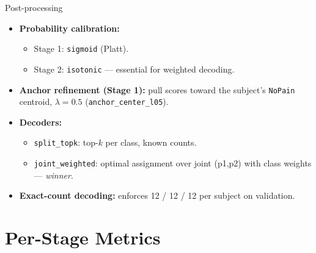 \documentclass[aspectratio=169,10pt]{beamer}
\begin{document}
\begin{frame}{Post-processing}
  \begin{itemize}
    \item \textbf{Probability calibration:}
      \begin{itemize}
        \item Stage 1: \texttt{sigmoid} (Platt).
        \item Stage 2: \texttt{isotonic} — essential for weighted decoding.
      \end{itemize}
    \item \textbf{Anchor refinement (Stage 1):} pull scores toward the subject's \texttt{NoPain} centroid, $\lambda=0.5$ (\texttt{anchor\_center\_l05}).
    \item \textbf{Decoders:}
      \begin{itemize}
        \item \texttt{split\_topk}: top-$k$ per class, known counts.
        \item \texttt{joint\_weighted}: optimal assignment over joint (p1,p2) with class weights — \emph{winner}.
      \end{itemize}
    \item \textbf{Exact-count decoding:} enforces 12 / 12 / 12 per subject on validation.
  \end{itemize}
\end{frame}

\section{Per-Stage Metrics}
\end{document}
